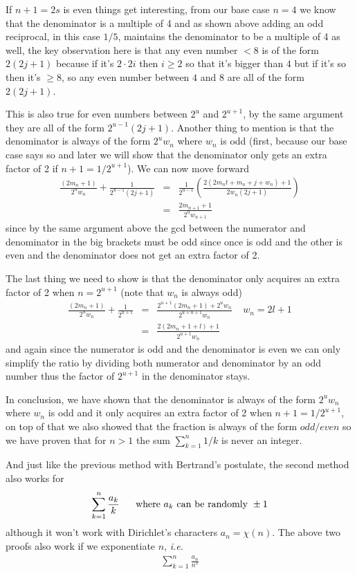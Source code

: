 \documentclass[aps,preprint,preprintnumbers,nofootinbib,showpacs,prd]{revtex4-1}
\newcommand{\ie}{{\it i.e.} }
\newcommand{\nbea}{\begin{eqnarray*}}
\newcommand{\neea}{\end{eqnarray*}}
\begin{document}
If $n+1=2s$ is even things get interesting, from our base case $n=4$ we know that the denominator is a multiple of 4 and as shown above adding an odd reciprocal, in this case $1/5$, maintains the denominator to be a multiple of 4 as well, the key observation here is that any even number $< 8$ is of the form $2(2j+1)$ because if it's $2\cdot 2i$ then $i \ge 2$ so that it's bigger than $4$ but if it's so then it's $\ge 8$, so any even number between $4$ and $8$ are all of the form $2(2j+1)$.

This is also true for even numbers between $2^u$ and $2^{u+1}$, by the same argument they are all of the form $2^{u-1}(2j+1)$. Another thing to mention is that the denominator is always of the form $2^u w_n$ where $w_n$ is odd (first, because our base case says so and later we will show that the denominator only gets an extra factor of 2 if $n+1 = 1/2^{u+1}$). We can now move forward 
%
\nbea
\frac{(2m_n + 1)}{2^u w_n} + \frac{1}{2^{u-1}(2j+1)} & = & \frac{1}{2^{u-1}} \left ( \frac{2(2m_n t + m_n + j + w_n) + 1}{2w_n (2j+1)} \right ) \\
& = & \frac{2m_{n+1} + 1}{2^uw_{n+1}}
\neea
%
since by the same argument above the gcd between the numerator and denominator in the big brackets must be odd since once is odd and the other is even and the denominator does not get an extra factor of 2.

The last thing we need to show is that the denominator only acquires an extra factor of 2 when $n = 2^{u+1}$ (note that $w_n$ is always odd)
%
\nbea
\frac{(2m_n + 1)}{2^u w_n} + \frac{1}{2^{u+1}} & = & \frac{2^{u+1}(2m_n + 1) + 2^u w_n}{2^{u + u + 1} w_n} ~~~~~ w_n = 2l + 1 \\
& = & \frac{2(2m_n + 1 + l) + 1}{2^{u+1}w_n}
\neea
%
and again since the numerator is odd and the denominator is even we can only simplify the ratio by dividing both numerator and denominator by an odd number thus the factor of $2^{u+1}$ in the denominator stays.

In conclusion, we have shown that the denominator is always of the form $2^uw_n$ where $w_n$ is odd and it only acquires an extra factor of 2 when $n+1 = 1/2^{u+1}$, on top of that we also showed that the fraction is always of the form $odd/even$ so we have proven that for $n > 1$ the sum $\sum_{k=1}^n 1/k$ is never an integer.

And just like the previous method with Bertrand's postulate, the second method also works for
%
\nbea
\sum_{k=1}^n \frac{a_k}{k} ~~~~~ {\rm where~} a_k~{\rm can~be~randomly~} \pm 1
\neea
%
although it won't work with Dirichlet's characters $a_n = \chi(n)$. The above two proofs also work if we exponentiate $n$, \ie
%
\nbea
\sum_{k=1}^n \frac{a_n}{n^s}
\neea
%
\end{document}
